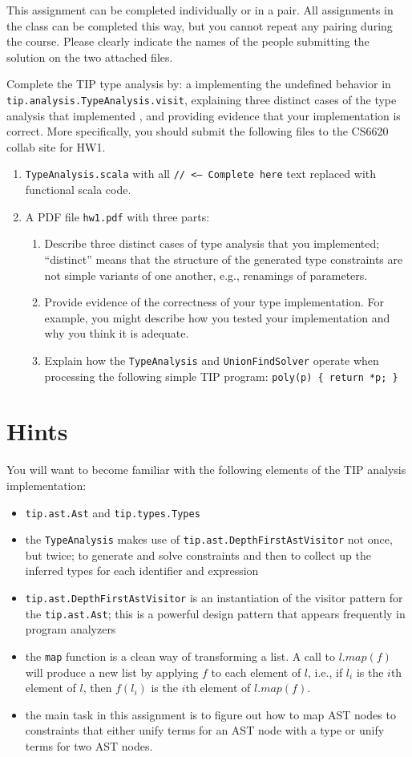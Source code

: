 \documentclass[12pt,letterpaper]{article}
\begin{document}
This assignment can be completed individually or in a pair.  All assignments in the class can be completed this way, but you cannot repeat any pairing during the course.  Please clearly indicate the names of the people submitting the solution on the two attached files.

Complete the TIP type analysis by: a implementing the undefined behavior in\\
\texttt{tip.analysis.TypeAnalysis.visit}, explaining three distinct cases of the type analysis that implemented , and providing evidence that your implementation is correct.  More specifically, you should submit the following files to the CS6620 collab site for HW1.
\begin{enumerate}
\item \texttt{TypeAnalysis.scala} with all \texttt{// <--- Complete here} text replaced with functional scala code.
\item A PDF file \texttt{hw1.pdf} with three parts:
\begin{enumerate}
\item Describe three distinct cases of type analysis that you implemented; ``distinct'' means that the structure of the generated type constraints are not simple variants of one another, e.g., renamings of parameters. 
\item Provide evidence of the correctness of your type implementation.  For example, you might describe how you tested your implementation and why you think it is adequate.
\item Explain how the \texttt{TypeAnalysis} and \texttt{UnionFindSolver} operate
when processing the following simple TIP program: \texttt{poly(p) \{ return *p; \}}
\end{enumerate}
\end{enumerate}

\section*{Hints}
You will want to become familiar with the following elements of the TIP analysis implementation:
\begin{itemize}
\item \texttt{tip.ast.Ast} and \texttt{tip.types.Types}
\item the \texttt{TypeAnalysis} makes use of \texttt{tip.ast.DepthFirstAstVisitor} not once, but twice; to generate and solve constraints and then to collect up the inferred types for each identifier and expression
\item \texttt{tip.ast.DepthFirstAstVisitor} is an instantiation of the visitor pattern for the \texttt{tip.ast.Ast}; this is a powerful design pattern that appears frequently in program analyzers
\item the \texttt{map} function is a clean way of transforming a list.  A call to $l.map(f)$ will produce a new list by applying $f$ to each element of $l$, i.e., if $l_i$ is the $i$th element of $l$, then $f(l_i)$ is the $i$th element of $l.map(f)$.
\item the main task in this assignment is to figure out how to map AST nodes to constraints that either unify terms for an AST node with a type or unify terms for two AST nodes.
\end{itemize}
\end{document}
